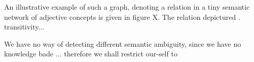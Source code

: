 \cite[p. 453-456, 468, 471]{ai}

An illustrative example of such a graph, denoting a relation in a tiny semantic network of adjective concepts is given in figure X. The relation depictured . 
transitivity...


We have no way of detecting different semantic ambiguity, since we have no knowledge bade ... therefore we shall restrict our-self to 
